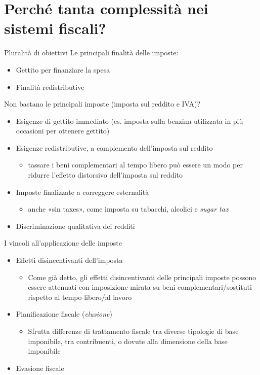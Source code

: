\documentclass[11pt]{beamer}
\begin{document}
\section{Perché tanta complessità nei sistemi fiscali?}

\begin{frame}{Pluralità di obiettivi}
Le principali finalità delle imposte:
\begin{itemize}
\item Gettito per finanziare la spesa
\item Finalità redistributive
\end{itemize}
Non bastano le principali imposte (imposta sul reddito e IVA)?
\begin{itemize}
\item Esigenze di gettito immediato (es. imposta sulla benzina utilizzata in più
occasioni per ottenere gettito)
\item Esigenze redistributive, a complemento dell'imposta sul reddito
\begin{itemize}
\item tassare i beni complementari al tempo libero può essere un modo per
ridurre l'effetto distorsivo dell'imposta sul reddito
\end{itemize}
\item Imposte finalizzate a correggere esternalità
\begin{itemize}
\item anche «sin taxes», come imposta su tabacchi, alcolici e \emph{sugar tax}
\end{itemize}
\item Discriminazione qualitativa dei redditi
\end{itemize}
\end{frame}
\begin{frame}{I vincoli all'applicazione delle imposte}
\begin{itemize}
\item Effetti disincentivanti dell'imposta
\begin{itemize}
\item Come già detto, gli effetti disincentivanti delle principali imposte
possono essere attenuati con imposizione mirata su beni
complementari/sostituti rispetto al tempo libero/al lavoro
\end{itemize}
\item Pianificazione fiscale (\emph{elusione})
\begin{itemize}
\item Sfrutta differenze di trattamento fiscale tra diverse tipologie di base
imponibile, tra contribuenti, o dovute alla dimensione della base
imponibile
\end{itemize}
\item Evasione fiscale
\end{itemize}
\end{frame}
\end{document}
